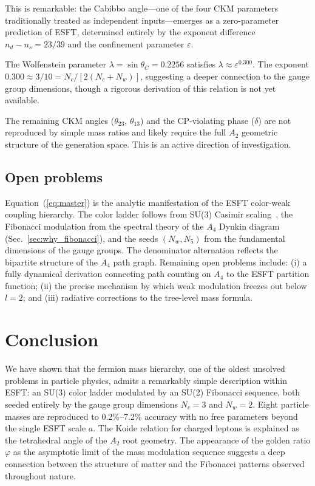 ﻿\documentclass[twocolumn,preprintnumbers,amsmath,amssymb,prd]{revtex4-2}
\newcommand{\koppa}{\text{\usefont{T1}{lmr}{m}{n}\symbol{"DE}}}%
\renewcommand{\koppa}{a}%
\begin{document}
This is remarkable: the Cabibbo angle---one of the four CKM parameters traditionally treated as independent inputs---emerges as a zero-parameter prediction of ESFT, determined entirely by the exponent difference $n_d - n_s = 23/39$ and the confinement parameter $\varepsilon$.

The Wolfenstein parameter $\lambda = \sin\theta_C = 0.2256$ satisfies $\lambda \approx \varepsilon^{0.300}$. The exponent $0.300 \approx 3/10 = N_c/[2(N_c+N_w)]$, suggesting a deeper connection to the gauge group dimensions, though a rigorous derivation of this relation is not yet available.

The remaining CKM angles ($\theta_{23}$, $\theta_{13}$) and the CP-violating phase ($\delta$) are not reproduced by simple mass ratios and likely require the full $A_2$ geometric structure of the generation space. This is an active direction of investigation.

\subsection{Open problems}

Equation~(\ref{eq:master}) is the analytic manifestation of the ESFT color-weak coupling hierarchy. The color ladder follows from SU(3) Casimir scaling~\cite{Paper2}, the Fibonacci modulation from the spectral theory of the $A_4$ Dynkin diagram (Sec.~\ref{sec:why_fibonacci}), and the seeds $(N_w, N_5)$ from the fundamental dimensions of the gauge groups. The denominator alternation reflects the bipartite structure of the $A_4$ path graph. Remaining open problems include: (i) a fully dynamical derivation connecting path counting on $A_4$ to the ESFT partition function; (ii) the precise mechanism by which weak modulation freezes out below $l = 2$; and (iii) radiative corrections to the tree-level mass formula.

\section{Conclusion}

We have shown that the fermion mass hierarchy, one of the oldest unsolved problems in particle physics, admits a remarkably simple description within ESFT: an SU(3) color ladder modulated by an SU(2) Fibonacci sequence, both seeded entirely by the gauge group dimensions $N_c = 3$ and $N_w = 2$. Eight particle masses are reproduced to 0.2\%--7.2\% accuracy with no free parameters beyond the single ESFT scale $\koppa$. The Koide relation for charged leptons is explained as the tetrahedral angle of the $A_2$ root geometry. The appearance of the golden ratio $\varphi$ as the asymptotic limit of the mass modulation sequence suggests a deep connection between the structure of matter and the Fibonacci patterns observed throughout nature.
\end{document}
